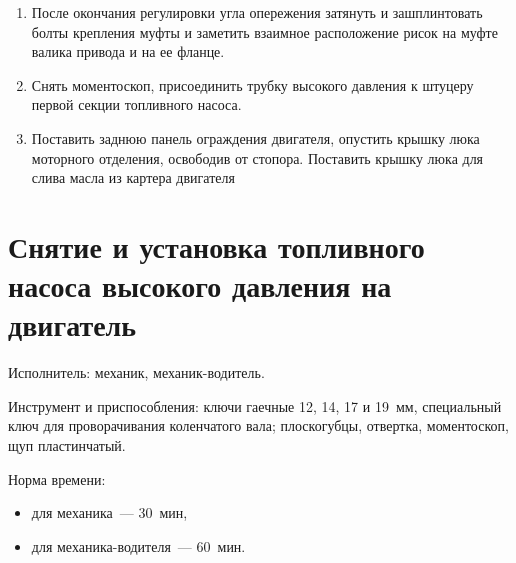 \begin{enumerate}
    Несовпадение рисок должно быть не больше одного градуса (одно деление). 

    Смещение полумуфты относительно ее фланца на одно деление соответствует четырем делениям на маховике или крышке шестерен распределения. 
    \item После окончания регулировки угла опережения затянуть и зашплинтовать болты крепления муфты и заметить взаимное расположение рисок на муфте валика привода и на ее фланце. 
    \item Снять моментоскоп, присоединить трубку высокого давления к штуцеру первой секции топливного насоса. 
    \item Поставить заднюю панель ограждения двигателя, опустить крышку люка моторного отделения, освободив от стопора. Поставить крышку люка для слива масла из картера двигателя
\end{enumerate}



\section{Снятие и установка топливного насоса высокого давления на двигатель}
Исполнитель: механик, механик-водитель. 

Инструмент и приспособления: ключи гаечные 12, 14, 17 и 19~мм, специальный ключ для проворачивания коленчатого вала; плоскогубцы, отвертка, моментоскоп, щуп пластинчатый. 

Норма времени:
\begin{itemize}
    \item для механика~--- 30~мин, 
    \item для механика-водителя~--- 60~мин. 
\end{itemize} 

